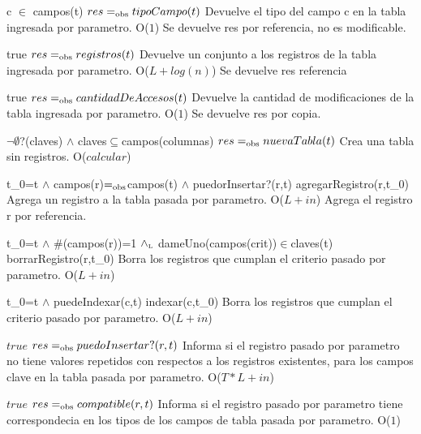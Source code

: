  {c $\in$ campos(t)}
 {$res =_{\mathrm{obs}} tipoCampo(t)$}
 {Devuelve el tipo del campo c en la tabla ingresada por parametro.}
 {O($1$)}
 {Se devuelve res por referencia, no es modificable.}
 
 {true}
 {$res =_{\mathrm{obs}} registros(t)$}
 {Devuelve un conjunto a los registros de la tabla ingresada por parametro.}
 {O($L + log(n)$) } %
 {Se devuelve res referencia}

 
 {true}
 {$res =_{\mathrm{obs}} cantidadDeAccesos(t)$}
 {Devuelve la cantidad de modificaciones de la tabla ingresada por parametro.}
 {O($1$)}
 {Se devuelve res por copia.}

 
 
 {$\neg\emptyset$?(claves) $\land$ claves$\subseteq$campos(columnas)}
 {$res =_{\mathrm{obs}} nuevaTabla(t)$}
 {Crea una tabla sin registros.}
 {O($calcular$)}
 {}

 {t\_0=t $\land$ campos(r)$=_{\mathrm{obs}}$campos(t) $\land$ puedorInsertar?(r,t)}
 {agregarRegistro(r,t\_0)}
 {Agrega un registro a la tabla pasada por parametro.}
 {O($L + in$)}
 {Agrega el registro r por referencia.} 
 
 {t\_0=t $\land$ $\#$(campos(r))=1 $\land_{\mathrm{\scriptscriptstyle{L}}}$ dameUno(campos(crit))$\in$claves(t)}
 {borrarRegistro(r,t\_0)}
 {Borra los registros que cumplan el criterio pasado por parametro.}
 {O($L + in$)}
 {} 
 
 {t\_0=t $\land$ puedeIndexar(c,t)}
 {indexar(c,t\_0)}
 {Borra los registros que cumplan el criterio pasado por parametro.}
 {O($L + in$)}
 {} 	
 

 {$true$}
 {$res =_{\mathrm{obs}} puedoInsertar?(r,t)$}
 {Informa si el registro pasado por parametro no tiene valores repetidos con respectos a los registros existentes, para los campos clave en la tabla pasada por parametro.}
 {O($T*L + in$)}
 {} 
 
 {$true$}
 {$res =_{\mathrm{obs}} compatible(r,t)$}
 {Informa si el registro pasado por parametro tiene correspondecia en los tipos de los campos de tabla pasada por parametro.}
 {O($1$)}
 {} 
 
